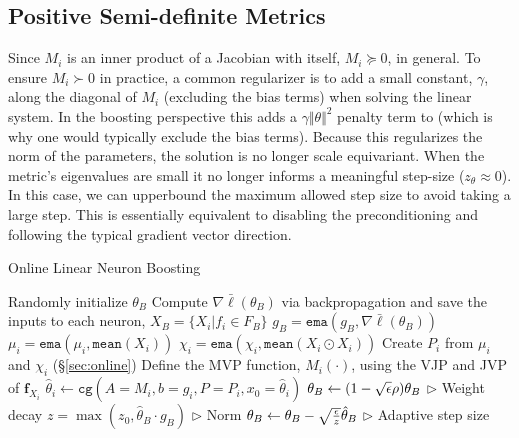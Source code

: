 \subsection{Positive Semi-definite Metrics}
\label{sec:PSD}
Since $M_i$ is an inner product of a Jacobian with itself, $M_i \succeq 0$, in general.
To ensure $M_i \succ 0$ in practice, a common regularizer is to add a small constant, $\gamma$,
along the diagonal of $M_i$ (excluding the bias terms) when solving the linear system. 
In the boosting perspective this adds a $\gamma \Vert \theta \Vert^2$ penalty term to 
(which is why one would typically exclude the bias terms).
Because this regularizes the norm of the parameters, the solution is no longer scale equivariant.
When the metric's eigenvalues are small it no longer informs a meaningful
step-size ($z_{\theta} \approx 0$). In this case, we can upperbound the maximum allowed step size
to avoid taking a large step. This is essentially equivalent to disabling the
preconditioning and following the typical gradient vector direction.

\begin{algorithm}[ht]
   \caption{Online Linear Neuron Boosting}
   \label{algo2}
   \begin{algorithmic}[1]
   \STATE Randomly initialize $\theta_B$
   \STATE Compute $\nabla \bar\ell(\theta_B)$ via backpropagation and save the 
   inputs to each neuron, $X_B = \{X_i | f_i \in F_B\}$
   \STATE $g_B = \texttt{ema}(g_B, \nabla \bar\ell(\theta_B))$
         \STATE $\mu_i = \texttt{ema}(\mu_i, \texttt{mean}(X_i))$
         \STATE $\chi_i = \texttt{ema}(\chi_i, \texttt{mean}(X_i \odot X_i))$
         \STATE Create $P_i$ from $\mu_i$ and $\chi_i$ (\S \ref{sec:online})
         \STATE Define the  MVP function, $M_i(\cdot)$, using the VJP and JVP of $\mathbf{f}_{X_i}$
         \STATE $\hat{\theta}_i \gets \texttt{cg}(A=M_i, b=g_i, P=P_i, x_0=\hat{\theta}_i)$
      \ENDFOR
      \STATE $\theta_B \gets (1-\sqrt{{\epsilon}}\rho)\theta_B$  \hfill $\triangleright$ Weight decay
      \STATE $z = \max(z_0, \hat{\theta}_B \cdot g_B)$  \hfill $\triangleright$ Norm
   \STATE $\theta_B \gets \theta_B - \sqrt{\frac{{\epsilon}}{z}} \hat{\theta}_B$ \hfill $\triangleright$ Adaptive step size
   \ENDFOR
   \end{algorithmic}
\end{algorithm}

